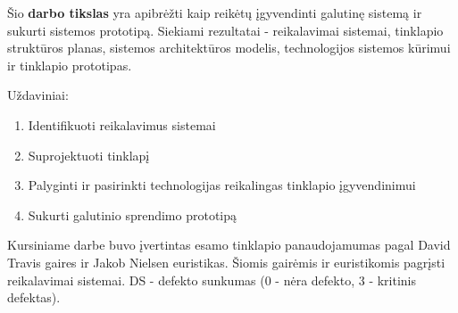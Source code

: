 \documentclass{VUMIFPSkursinis}
\begin{document}
Šio \textbf{darbo tikslas} yra apibrėžti kaip reikėtų įgyvendinti galutinę sistemą ir sukurti sistemos prototipą. Siekiami rezultatai - reikalavimai sistemai, tinklapio struktūros planas, sistemos architektūros modelis, technologijos sistemos kūrimui ir tinklapio prototipas.

Uždaviniai:
\begin{enumerate}
	\item Identifikuoti reikalavimus sistemai
	\item Suprojektuoti tinklapį
	\item Palyginti ir pasirinkti technologijas reikalingas tinklapio įgyvendinimui
	\item Sukurti galutinio sprendimo prototipą
\end{enumerate}

Kursiniame darbe buvo įvertintas esamo tinklapio panaudojamumas pagal David Travis gaires ir Jakob Nielsen euristikas\cite{Kursinis}. Šiomis gairėmis ir euristikomis pagrįsti reikalavimai sistemai. DS - defekto sunkumas (0 - nėra defekto, 3 - kritinis defektas).
\end{document}
